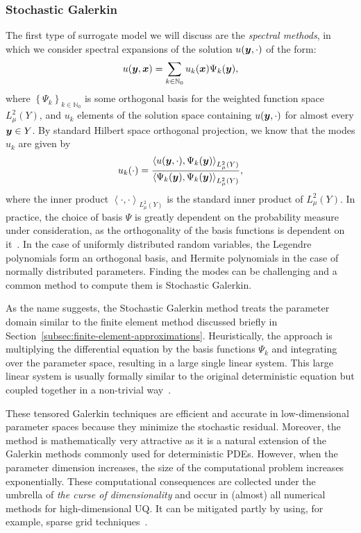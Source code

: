 \subsubsection{Stochastic Galerkin}\label{subsec:spectral-methods}
The first type of surrogate model we will discuss are the \emph{spectral methods}, in which we consider spectral expansions of the solution $u({\bm{y}},\cdot)$ of the form:
\begin{equation*}
    u({\bm{y}}, {{\bm{x}}}) = \sum_{k\in\mathbb{N}_0} u_k({{\bm{x}}}) \Psi_k({\bm{y}}),
\end{equation*}
where $\left\{ \Psi_k \right\}_{k\in\mathbb{N}_0}$ is some orthogonal basis for the weighted function space $L^2_\mu(Y)$, and $u_k$ elements of the solution space containing $u({\bm{y}}, \cdot)$ for almost every ${\bm{y}}\in Y$.
By standard Hilbert space orthogonal projection, we know that the modes $u_k$ are given by
\begin{equation*}
    u_k(\cdot)=\frac{\left< u({\bm{y}},\cdot), \Psi_k({\bm{y}}) \right>_{L^2_\mu(Y)}}{\left<  \Psi_k({\bm{y}}),\Psi_k({\bm{y}})\right>_{L^2_\mu(Y)} },
\end{equation*}
where the inner product $\left< \cdot, \cdot \right>_{L^2_\mu(Y)}$ is the standard inner product of $L^2_\mu(Y)$.
In practice, the choice of basis $\Psi$ is greatly dependent on the probability measure under consideration, as the orthogonality of the basis functions is dependent on it~\cite[Chapter~8]{sullivan2015}.
In the case of uniformly distributed random variables, the Legendre polynomials form an orthogonal basis, and Hermite polynomials in the case of normally distributed parameters.
Finding the modes can be challenging and a common method to compute them is Stochastic Galerkin.

As the name suggests, the Stochastic Galerkin method treats the parameter domain similar to the finite element method discussed briefly in Section~\ref{subsec:finite-element-approximations}.
Heuristically, the approach is multiplying the differential equation by the basis functions $\Psi_k$ and integrating over the parameter space, resulting in a large single linear system.
This large linear system is usually formally similar to the original deterministic equation but coupled together in a non-trivial way~\cite[Chapter~12]{sullivan2015}.

These tensored Galerkin techniques are efficient and accurate in low-dimensional parameter spaces because they minimize the stochastic residual.
Moreover, the method is mathematically very attractive as it is a natural extension of the Galerkin methods commonly used for deterministic PDEs.
However, when the parameter dimension increases, the size of the computational problem increases exponentially.
These computational consequences are collected under the umbrella of \emph{the curse of dimensionality} and occur in (almost) all numerical methods for high-dimensional UQ\@.
It can be mitigated partly by using, for example, sparse grid techniques~\cite[Chapter~11]{smith2024}.

